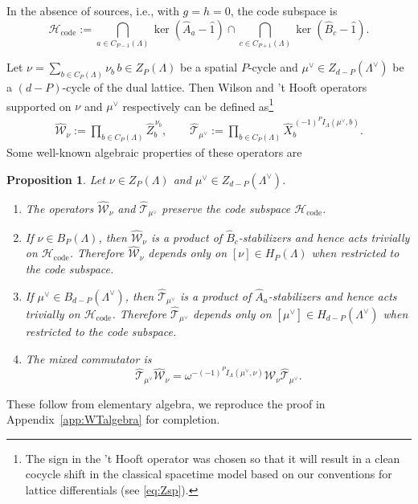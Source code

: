 \documentclass[dvipsnames,a4paper]{article}
\numberwithin{equation}{section}
\newtheorem{prop}[theorem]{Proposition}
\theoremstyle{definition}
\theoremstyle{remark}
\begin{document}
In the absence of sources, i.e., with $g=h=0$, the code subspace is
\begin{equation}
	\mathcal H_{\mathrm{code}}
	:=
	\bigcap_{a\in C_{P-1}(\Lambda)}\ker(\hat A_a-\hat 1)
	\cap
	\bigcap_{c\in C_{P+1}(\Lambda)}\ker(\hat B_c-\hat 1).
	\label{eq:code-subspace}
\end{equation}

Let $\nu=\sum_{b\in C_P(\Lambda)}\nu_b\,b\in Z_P(\Lambda)$ be a spatial \(P\)-cycle and $\mu^\vee\in Z_{d-P}(\Lambda^\vee)$ be a $(d-P)$-cycle of the dual lattice. Then Wilson and 't Hooft operators supported on $\nu$ and $\mu^\vee$ respectively can be defined as\footnote{The sign in the 't Hooft operator was chosen so that it will result in a clean cocycle shift in the classical spacetime model based on our conventions for lattice differentials (see \eqref{eq:Zsp}).}
\begin{align}
	\hat{\mathcal W}_\nu
	:=
	\prod_{b\in C_P(\Lambda)}\hat Z_b^{\,\nu_b},
	\qquad
	\hat{\mathcal T}_{\mu^\vee}
	:=
	\prod_{b\in C_P(\Lambda)}
	\hat X_b^{\,(-1)^P I_\Lambda(\mu^\vee,b)}.
	\label{eq:quantumWT}
\end{align}
Some well-known algebraic properties of these operators are
\begin{prop}
	\label{prop:spatial-WT}
	Let \(\nu\in Z_P(\Lambda)\) and
	\(\mu^\vee\in Z_{d-P}(\Lambda^\vee)\).
	\begin{enumerate}[label=(\roman*)]
		\item\label{prop:WTpreserves} The operators \(\hat{\mathcal W}_\nu\) and
		\(\hat{\mathcal T}_{\mu^\vee}\) preserve the code subspace
		\(\mathcal H_{\mathrm{code}}\).
		
		\item\label{prop:Wtrivial} If \(\nu\in B_P(\Lambda)\), then \(\hat{\mathcal W}_\nu\) is a product of
		\(\hat B_c\)-stabilizers and hence acts trivially on
		\(\mathcal H_{\mathrm{code}}\). Therefore \(\hat{\mathcal W}_\nu\) depends only on
		\([\nu]\in H_P(\Lambda)\) when restricted to the code subspace.
		
		\item\label{prop:Ttrivial} If \(\mu^\vee\in B_{d-P}(\Lambda^\vee)\), then
		\(\hat{\mathcal T}_{\mu^\vee}\) is a product of \(\hat A_a\)-stabilizers and hence
		acts trivially on \(\mathcal H_{\mathrm{code}}\). Therefore
		\(\hat{\mathcal T}_{\mu^\vee}\) depends only on
		\([\mu^\vee]\in H_{d-P}(\Lambda^\vee)\) when restricted to the code subspace.
		
		\item\label{prop:WTcommutator} The mixed commutator is
		\begin{equation}
			\hat{\mathcal T}_{\mu^\vee}\hat{\mathcal W}_\nu
			=
			\omega^{-(-1)^P I_\Lambda(\mu^\vee,\nu)}
			\hat{\mathcal W}_\nu\hat{\mathcal T}_{\mu^\vee}.
		\end{equation}
	\end{enumerate}
\end{prop}
These follow from elementary algebra, we reproduce the proof in Appendix~\ref{app:WTalgebra} for completion.
\end{document}
